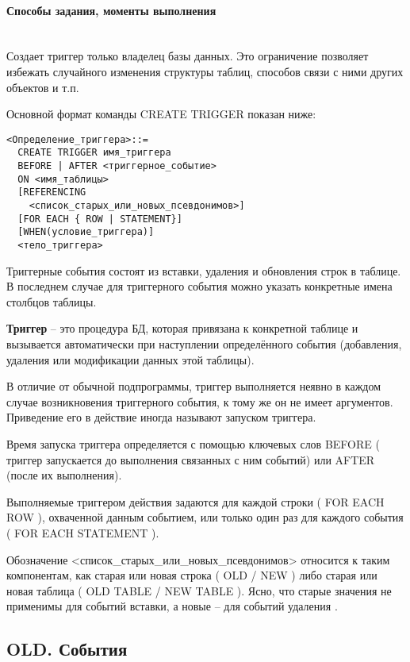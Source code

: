 \paragraph{Способы задания, моменты выполнения} ~\\

Создает триггер только владелец базы данных. Это ограничение позволяет избежать случайного изменения структуры таблиц, способов связи с ними других объектов и т.п.


Основной формат команды CREATE TRIGGER показан ниже:
\begin{verbatim}
<Определение_триггера>::=
  CREATE TRIGGER имя_триггера
  BEFORE | AFTER <триггерное_событие>
  ON <имя_таблицы>
  [REFERENCING
    <список_старых_или_новых_псевдонимов>]
  [FOR EACH { ROW | STATEMENT}]
  [WHEN(условие_триггера)]
  <тело_триггера>
\end{verbatim}

Триггерные события состоят из вставки, удаления и обновления строк в таблице. В последнем случае для триггерного события можно указать конкретные имена столбцов таблицы.

\begin{grayquote}
    \textbf{Триггер} – это процедура БД, которая привязана к конкретной таблице и вызывается автоматически при наступлении определённого события (добавления, удаления или модификации данных этой таблицы).
\end{grayquote}

В отличие от обычной подпрограммы, триггер выполняется неявно в каждом случае возникновения триггерного события, к тому же он не имеет аргументов. Приведение его в действие иногда называют запуском триггера.


Время запуска триггера определяется с помощью ключевых слов BEFORE ( триггер запускается до выполнения связанных с ним событий) или AFTER (после их выполнения).


Выполняемые триггером действия задаются для каждой строки ( FOR EACH ROW ), охваченной данным событием, или только один раз для каждого события ( FOR EACH STATEMENT ).


Обозначение <список\_старых\_или\_новых\_псевдонимов> относится к таким компонентам, как старая или новая строка ( OLD / NEW ) либо старая или новая таблица ( OLD TABLE / NEW TABLE ). Ясно, что старые значения не применимы для событий вставки, а новые – для событий удаления \autocite{IntuitTrigg}.

\subsection{OLD. События}

